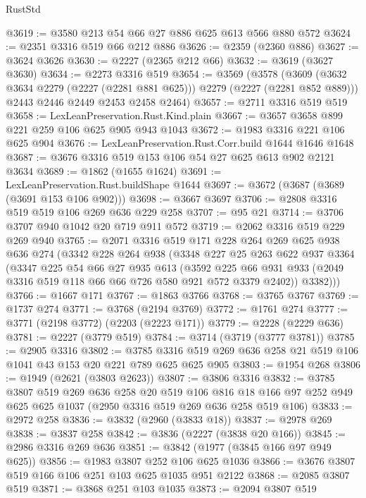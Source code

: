 \begin{lexlean}{RustStd}
\begin{coremodule}
@3619 := @3580 @213 @54 @66 @27 @886 @625 @613 @566 @880 @572
@3624 := @2351 @3316 @519 @66 @212 @886
@3626 := @2359 (@2360 @886)
@3627 := @3624 @3626
@3630 := @2227 (@2365 @212 @66)
@3632 := @3619 (@3627 @3630)
@3634 := @2273 @3316 @519
@3654 := @3569
    (@3578
      (@3609 (@3632 @3634 @2279 (@2227 (@2281 @881 @625))) @2279 (@2227 (@2281 @852 @889)))
      @2443
      @2446
      @2449
      @2453
      @2458
      @2464)
@3657 := @2711 @3316 @519 @519
@3658 := LexLeanPreservation.Rust.Kind.plain
@3667 := @3657 @3658 @899 @221 @259 @106 @625 @905 @943 @1043
@3672 := @1983 @3316 @221 @106 @625 @904
@3676 := LexLeanPreservation.Rust.Corr.build @1644 @1646 @1648
@3687 := @3676 @3316 @519 @153 @106 @54 @27 @625 @613 @902 @2121 @3634
@3689 := @1862 (@1655 @1624)
@3691 := LexLeanPreservation.Rust.buildShape @1644
@3697 := @3672 (@3687 (@3689 (@3691 @153 @106 @902)))
@3698 := @3667 @3697
@3706 := @2808 @3316 @519 @519 @106 @269 @636 @229 @258
@3707 := @95 @21
@3714 := @3706 @3707 @940 @1042 @20 @719 @911 @572
@3719 := @2062 @3316 @519 @229 @269 @940
@3765 := @2071
    @3316
    @519
    @171
    @228
    @264
    @269
    @625
    @938
    @636
    @274
    (@3342
      @228
      @264
      @938
      (@3348
        @227
        @25
        @263
        @622
        @937
        @3364
        (@3347
          @225
          @54
          @66
          @27
          @935
          @613
          (@3592 @225 @66 @931 @933 (@2049 @3316 @519 @118 @66 @66 @726 @580 @921 @572 @3379 @2402))
          @3382)))
@3766 := @1667 @171
@3767 := @1863 @3766
@3768 := @3765 @3767
@3769 := @1737 @274
@3771 := @3768 (@2194 @3769)
@3772 := @1761 @274
@3777 := @3771 (@2198 @3772) (@2203 (@2223 @171))
@3779 := @2228 (@2229 @636)
@3781 := @2227 (@3779 @519)
@3784 := @3714 (@3719 (@3777 @3781))
@3785 := @2905 @3316
@3802 := @3785 @3316 @519 @269 @636 @258 @21 @519 @106 @1041 @43 @153 @20 @221 @789 @625 @625 @905
@3803 := @1954 @268
@3806 := @1949 (@2621 (@3803 @2623))
@3807 := @3806 @3316
@3832 := @3785
    @3807
    @519
    @269
    @636
    @258
    @20
    @519
    @106
    @816
    @18
    @166
    @97
    @252
    @949
    @625
    @625
    @1037
    (@2950 @3316 @519 @269 @636 @258 @519 @106)
@3833 := @2972 @258
@3836 := @3832 (@2960 (@3833 @18))
@3837 := @2978 @269
@3838 := @3837 @258
@3842 := @3836 (@2227 (@3838 @20 @166))
@3845 := @2986 @3316 @269 @636
@3851 := @3842 (@1977 (@3845 @166 @97 @949 @625))
@3856 := @1983 @3807 @252 @106 @625 @1036
@3866 := @3676 @3807 @519 @166 @106 @251 @103 @625 @1035 @951 @2122
@3868 := @2085 @3807 @519
@3871 := @3868 @251 @103 @1035
@3873 := @2094 @3807 @519

\end{coremodule}
\end{lexlean}
